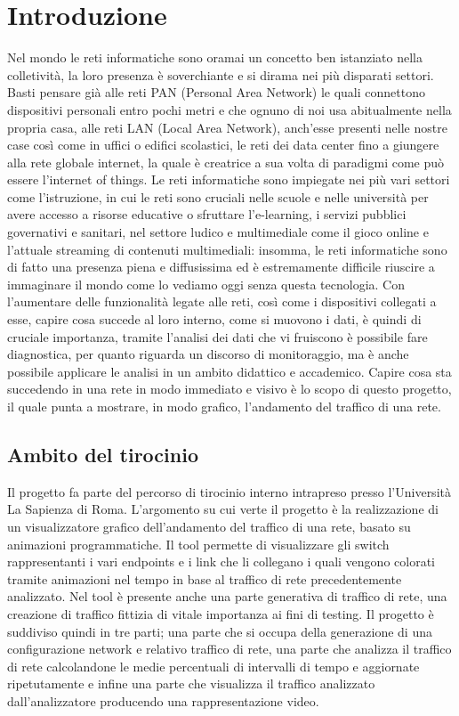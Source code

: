 \documentclass[binding=0.6cm]{sapthesis}
\begin{document}
\chapter{Introduzione}
Nel mondo le reti informatiche sono oramai un concetto ben istanziato 
nella colletività, la loro presenza è soverchiante e si dirama nei più disparati settori.
Basti pensare già alle  reti PAN (Personal Area Network) le quali connettono dispositivi
personali entro pochi metri e che ognuno di noi usa abitualmente nella propria casa, 
alle reti LAN (Local Area Network), 
anch'esse presenti
nelle nostre case così come in uffici o edifici scolastici, le reti dei data center 
fino a giungere alla rete globale internet, la quale è creatrice a sua volta di paradigmi come
può essere l'internet of things. Le reti informatiche sono impiegate nei più vari 
settori come l'istruzione, in cui le reti
sono cruciali nelle scuole e nelle università per avere accesso a risorse educative o sfruttare l'e-learning, i servizi
pubblici governativi e sanitari, nel settore ludico e multimediale come il gioco online e l'attuale
streaming di contenuti multimediali: insomma, le reti informatiche sono di fatto una presenza piena e diffusissima
ed è estremamente difficile riuscire a immaginare il mondo come lo vediamo oggi senza questa tecnologia.
Con l'aumentare delle funzionalità legate alle reti, così come i dispositivi collegati a esse, capire cosa succede al
loro interno, come si muovono i dati, è quindi di cruciale importanza, tramite l'analisi dei dati che vi fruiscono è possibile fare diagnostica, per quanto
riguarda un discorso di monitoraggio, ma è anche possibile applicare le analisi in un ambito didattico e accademico.
Capire cosa sta succedendo in una rete in modo immediato e visivo è lo scopo di questo progetto, il quale punta a mostrare,
in modo grafico, l'andamento del traffico di una rete.
\section{Ambito del tirocinio}
Il progetto fa parte del percorso di tirocinio interno intrapreso presso l'Università La Sapienza di Roma. L'argomento su cui verte il progetto
è la realizzazione di un visualizzatore grafico dell'andamento del traffico di una rete, basato
su animazioni programmatiche. Il tool permette di visualizzare gli switch rappresentanti 
i vari endpoints e i link
che li collegano i quali vengono colorati tramite animazioni nel tempo in base al traffico di 
rete precedentemente analizzato. Nel tool è presente anche una parte generativa di traffico di rete,
una creazione di traffico fittizia di vitale importanza ai fini di testing. Il progetto è suddiviso quindi in tre parti; una parte
che si occupa della generazione di una configurazione network e relativo traffico di rete, 
una parte che analizza il traffico di rete
calcolandone le medie percentuali di intervalli di tempo e aggiornate ripetutamente e infine 
una parte che visualizza il traffico analizzato
dall'analizzatore producendo una rappresentazione video.
\end{document}
